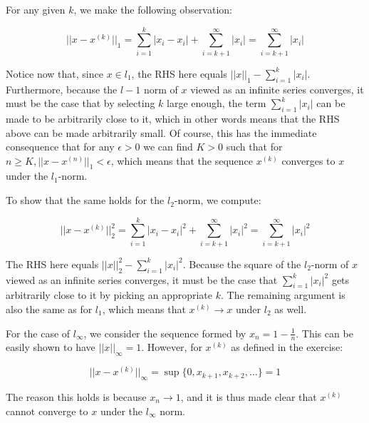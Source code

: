 \begin{solution}
    
    For any given $k$, we make the following observation:

    $$\lvert \lvert x - x^{(k)} \rvert \rvert_1 = \sum_{i=1}^{k} \lvert x_i - x_i \rvert + \sum_{i=k+1}^{\infty} \lvert x_i \rvert = \sum_{i=k+1}^{\infty} \lvert x_i \rvert$$

    Notice now that, since $x \in l_1$, the RHS here equals $\lvert \lvert x \rvert \rvert_1 - \sum_{i=1}^{k} \lvert x_i \rvert$.
    Furthermore, because the $l-1$ norm of $x$ viewed as an infinite series converges, it must be the case that by selecting $k$ large enough, the term $\sum_{i=1}^{k} \lvert x_i \rvert$ can be made to be arbitrarily close to it, which in other words means that the RHS above can be made arbitrarily small.
    Of course, this has the immediate consequence that for any $\epsilon > 0$ we can find $K > 0$ such that for $n \geq K, \lvert \lvert x - x^{(n)} \rvert \rvert_1 < \epsilon$, which means that the sequence $x^{(k)}$ converges to $x$ under the $l_1$-norm.
    
    To show that the same holds for the $l_2$-norm, we compute:

    $$\lvert \lvert x - x^{(k)} \rvert \rvert_2^2 = \sum_{i=1}^{k} \lvert x_i - x_i \rvert^2 + \sum_{i=k+1}^{\infty} \lvert x_i \rvert^2 = \sum_{i=k+1}^{\infty} \lvert x_i \rvert^2$$

    The RHS here equals $\lvert \lvert x \rvert \rvert_2^2 - \sum_{i=1}^{k} \lvert x_i \rvert^2$.
    Because the square of the $l_2$-norm of $x$ viewed as an infinite series converges, it must be the case that $\sum_{i=1}^{k} \lvert x_i \rvert^2$ gets arbitrarily close to it by picking an appropriate $k$.
    The remaining argument is also the same as for $l_1$, which means that $x^{(k)} \rightarrow x$ under $l_2$ as well.

    For the case of $l_{\infty}$, we consider the sequence formed by $x_n = 1 - \frac{1}{n}$.
    This can be easily shown to have $\lvert \lvert x \rvert \rvert_{\infty} = 1$.
    However, for $x^{(k)}$ as defined in the exercise:

    $$\lvert \lvert x - x^{(k)} \rvert \rvert_{\infty} = \sup\{0, x_{k+1}, x_{k+2}, \ldots\} = 1$$

    The reason this holds is because $x_n \rightarrow 1$, and it is thus made clear that $x^{(k)}$ cannot converge to $x$ under the $l_{\infty}$ norm.
\end{solution}

